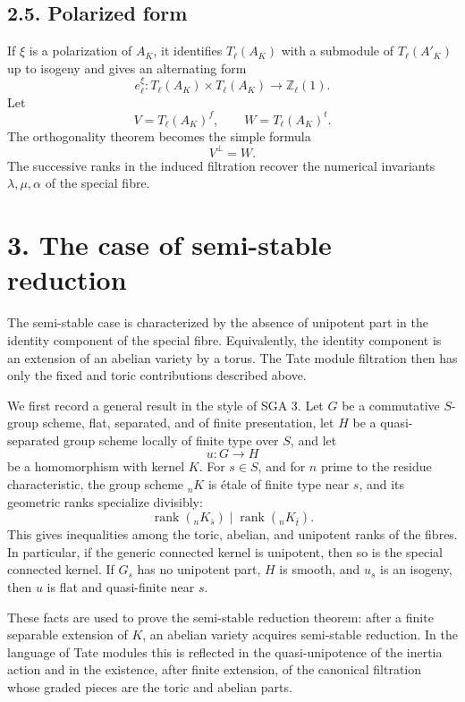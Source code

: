 \documentclass[11pt]{article}
\newcommand{\bZ}{\mathbb Z}
\begin{document}
\subsection*{2.5. Polarized form}

If \(\xi\) is a polarization of \(A_K\), it identifies \(T_\ell(A_K)\) with a
submodule of \(T_\ell(A'_K)\) up to isogeny and gives an alternating form
\[
e_\ell^\xi:T_\ell(A_K)\times T_\ell(A_K)\to \bZ_\ell(1).
\]
Let
\[
V=T_\ell(A_K)^f,\qquad W=T_\ell(A_K)^t.
\]
The orthogonality theorem becomes the simple formula
\[
V^\perp=W.
\]
The successive ranks in the induced filtration recover the numerical invariants
\(\lambda,\mu,\alpha\) of the special fibre.

\section*{3. The case of semi-stable reduction}

The semi-stable case is characterized by the absence of unipotent part in the
identity component of the special fibre. Equivalently, the identity component is
an extension of an abelian variety by a torus. The Tate module filtration then
has only the fixed and toric contributions described above.

We first record a general result in the style of SGA 3. Let \(G\) be a
commutative \(S\)-group scheme, flat, separated, and of finite presentation, let
\(H\) be a quasi-separated group scheme locally of finite type over \(S\), and
let
\[
u:G\to H
\]
be a homomorphism with kernel \(K\). For \(s\in S\), and for \(n\) prime to the
residue characteristic, the group scheme \({}_nK\) is étale of finite type near
\(s\), and its geometric ranks specialize divisibly:
\[
\operatorname{rank}({}_nK_{\bar s})\mid
\operatorname{rank}({}_nK_{\bar t}).
\]
This gives inequalities among the toric, abelian, and unipotent ranks of the
fibres. In particular, if the generic connected kernel is unipotent, then so is
the special connected kernel. If \(G_s\) has no unipotent part, \(H\) is smooth,
and \(u_s\) is an isogeny, then \(u\) is flat and quasi-finite near \(s\).

These facts are used to prove the semi-stable reduction theorem: after a finite
separable extension of \(K\), an abelian variety acquires semi-stable reduction.
In the language of Tate modules this is reflected in the quasi-unipotence of the
inertia action and in the existence, after finite extension, of the canonical
filtration whose graded pieces are the toric and abelian parts.
\end{document}
